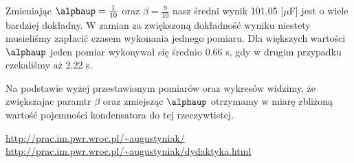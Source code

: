 \documentclass[12pt]{mwrep}
\let\alpha\alphaup
\begin{document}
	Zmieniając $\alpha = \frac{1}{10}$ oraz $\beta = \frac{9}{10}$ nasz średni wynik 101.05 [$\mu$F] jest o wiele bardziej dokładny. W zamian za zwiększoną dokładność wyniku niestety musieliśmy zapłacić czasem wykonania jednego pomiaru. Dla większych wartości $\alpha$ jeden pomiar wykonywał się średnio 0.66 s, gdy w drugim przypadku czekaliśmy aż 2.22 s.%
	
	Na podstawie wyżej przestawionym pomiarów oraz wykresów widzimy, że zwiększajac paramtr $\beta$ oraz zmiejsząc $\alpha$ otrzymamy w miarę zbliżoną wartość pojemności kondensatora do tej rzeczywtistej.
	
	
	\begin{thebibliography}{1}%
		\url{http://prac.im.pwr.wroc.pl/~augustyniak/}
		\url{http://prac.im.pwr.wroc.pl/~augustyniak/dydaktyka.html}
	\end{thebibliography}
	
\end{document}
